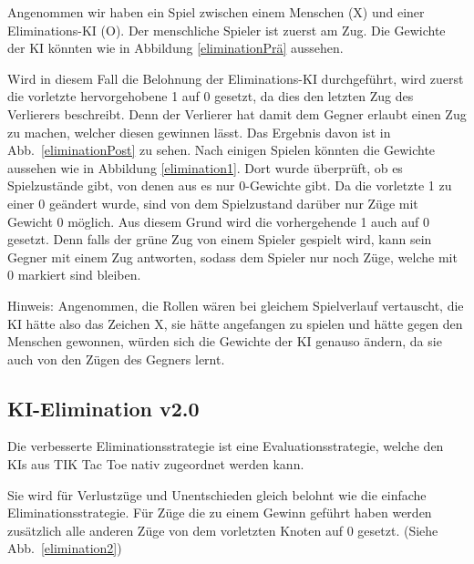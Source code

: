 \documentclass[titlepage]{scrartcl}
\newcommand{\TicTacToe}{TI\reflectbox K Tac Toe}
\begin{document}
Angenommen wir haben ein Spiel zwischen einem Menschen (X) und einer Eliminations-KI (O).
Der menschliche Spieler ist zuerst am Zug.
Die Gewichte der KI könnten wie in Abbildung \ref{eliminationPrä} aussehen.

Wird in diesem Fall die Belohnung der Eliminations-KI durchgeführt, wird zuerst die vorletzte hervorgehobene 1 auf 0 gesetzt, da dies den letzten Zug des Verlierers beschreibt.
Denn der Verlierer hat damit dem Gegner erlaubt einen Zug zu machen, welcher diesen gewinnen lässt.
Das Ergebnis davon ist in Abb.~\ref{eliminationPost} zu sehen.
Nach einigen Spielen könnten die Gewichte aussehen wie in Abbildung \ref{elimination1}.
Dort wurde überprüft, ob es Spielzustände gibt, von denen aus es nur 0-Gewichte gibt. Da die vorletzte 1 zu einer 0 geändert wurde, sind von dem Spielzustand darüber nur Züge mit Gewicht 0 möglich. Aus diesem Grund wird die vorhergehende 1 auch auf 0 gesetzt. Denn falls der grüne Zug von einem Spieler gespielt wird, kann sein Gegner mit einem Zug antworten, sodass dem Spieler nur noch Züge, welche mit 0 markiert sind bleiben.

Hinweis: Angenommen, die Rollen wären bei gleichem Spielverlauf vertauscht, die KI hätte also das Zeichen X, sie hätte angefangen zu spielen und hätte gegen den Menschen gewonnen, würden sich die Gewichte der KI genauso ändern, da sie auch von den Zügen des Gegners lernt.
\FloatBarrier
\newpage

\subsection{KI-Elimination v2.0}
Die verbesserte Eliminationsstrategie ist eine Evaluationsstrategie, welche den KIs aus \TicTacToe{} nativ zugeordnet werden kann.

Sie wird für Verlustzüge und Unentschieden gleich belohnt wie die einfache Eliminationsstrategie.
Für Züge die zu einem Gewinn geführt haben werden zusätzlich alle anderen Züge von dem vorletzten Knoten auf 0 gesetzt. (Siehe Abb.~\ref{elimination2})
\end{document}

